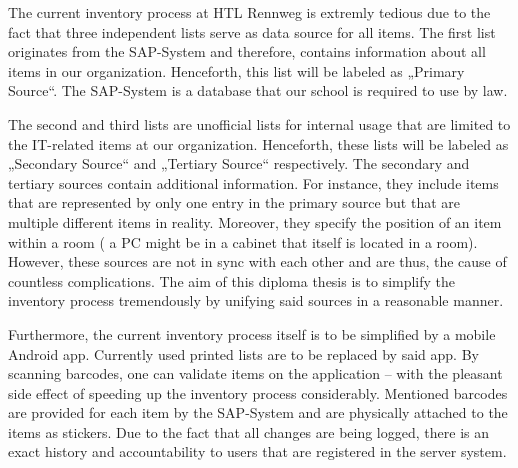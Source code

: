 The current inventory process at HTL Rennweg is extremly tedious due to the fact that three independent lists serve as 
data source for all items. The first list originates from the SAP-System and therefore, contains information about all items in our organization.
Henceforth, this list will be labeled as „Primary Source“. The SAP-System is a database that our school is required to use by law. 

The second and third lists are unofficial lists for internal usage that are limited to the IT-related items at our organization. 
Henceforth, these lists will be labeled as „Secondary Source“ and „Tertiary Source“ respectively.
The secondary and tertiary sources contain additional information. For instance, they include items that are represented by only one entry in the primary source but that are multiple different items in reality. Moreover, they specify the position of an item within a room (\eg{} a PC might be in a cabinet that itself is located in a room).
However, these sources are not in sync with each other and are thus, the cause 
of countless complications. The aim of this diploma thesis is to simplify the inventory process tremendously by unifying said sources in a reasonable manner.

Furthermore, the current inventory process itself is to be simplified by a mobile Android app. Currently used printed lists are to be replaced 
by said app. By scanning barcodes, one can validate items on the application -- with the pleasant side effect of speeding up the inventory process
considerably. Mentioned barcodes are provided for each item by the SAP-System and are physically attached to the items as stickers. 
Due to the fact that all changes are being logged, there is an exact history and accountability to users that are registered in the server system.